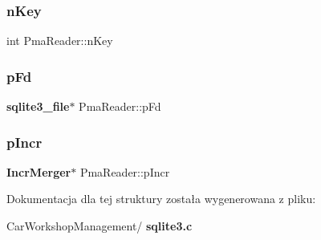 \mbox{\label{struct_pma_reader_a02c5dbf65efa252a84259b1ee2a7cd3c}} 
\subsubsection{nKey}
{\footnotesize\ttfamily int Pma\+Reader\+::n\+Key}

\mbox{\label{struct_pma_reader_a1ae1caa6e4b1900937135aeeaf1336cd}} 
\subsubsection{pFd}
{\footnotesize\ttfamily \textbf{ sqlite3\+\_\+file}$\ast$ Pma\+Reader\+::p\+Fd}

\mbox{\label{struct_pma_reader_a34569bea49de8122239eb40eaae8b10f}} 
\subsubsection{pIncr}
{\footnotesize\ttfamily \textbf{ Incr\+Merger}$\ast$ Pma\+Reader\+::p\+Incr}



Dokumentacja dla tej struktury została wygenerowana z pliku\+:\begin{DoxyCompactItemize}
\item 
Car\+Workshop\+Management/\textbf{ sqlite3.\+c}\end{DoxyCompactItemize}
